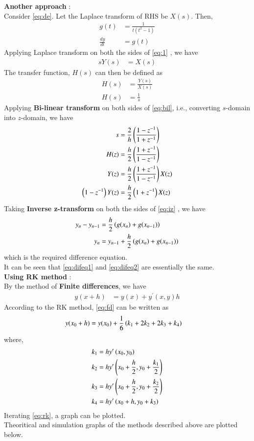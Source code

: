 \documentclass[journal]{IEEEtran}
\begin{document}
\begin{enumerate}
\textbf{Another approach} : \\
Consider \eqref{eq:de}. Let the Laplace transform of RHS be $X(s)$. Then, 
\begin{align}
	g(t) &= \frac{1}{t(t^2 - 1)} \\
	\frac{dy}{dt} &= g(t) \label{eq:1}
\end{align}
Applying Laplace transform on both the sides of \eqref{eq:1} , we have 
\begin{align}
	s Y(s) &= X(s) 
\end{align}
The transfer function, $H(s)$ can then be defined as
\begin{align}
	H(s) &= \frac{Y(s)}{X(s)} \\
	H(s) &= \frac{1}{s} \label{eq:bil}
\end{align}
Applying \textbf{Bi-linear transform} on both sides of \eqref{eq:bil}, i.e., converting $s$-domain into $z$-domain, we have
\begin{align}
	s &= \frac{2}{h} \left(\frac{1 - z^{-1}}{1 + z^{-1}}\right) \\
	H(z) &= \frac{h}{2} \left(\frac{1 + z^{-1}}{1 - z^{-1}}\right) \\
	Y(z) &= \frac{h}{2} \left(\frac{1 + z^{-1}}{1 - z^{-1}}\right) X(z) \\
	\left(1 - z^{-1}\right) Y(z) &= \frac{h}{2} \left(1 + z^{-1}\right) X(z) \label{eq:iz} 
\end{align}
Taking \textbf{Inverse z-transform} on both the sides of \eqref{eq:iz} , we have
\begin{align}
	y_{n} - y_{n-1} &= \frac{h}{2} \left(g(x_{n}) + g(x_{n-1})\right) \\
	y_{n} &= y_{n-1} + \frac{h}{2} \left(g(x_{n}) + g(x_{n-1})\right) \label{eq:difeq2}
\end{align}
which is the required difference equation. \\
It can be seen that \eqref{eq:difeq1} and \eqref{eq:difeq2} are essentially the same. \\
\textbf{Using RK method} : \\
By the method of \textbf{Finite differences}, we have \\
\begin{align}
	y(x + h) &= y(x) + y^{\prime}(x,y) h \label{eq:fd}
\end{align}
According to the RK method, \eqref{eq:fd} can be written as
\begin{align}
	y(x_0 + h) &= y(x_0) + \frac{1}{6} \left(k_1 + 2k_2 + 2k_3 + k_4\right) \label{eq:rk}
\end{align}
where, 
\begin{align}
	k_1 &= h y^{\prime} \left(x_0, y_0\right) \\
	k_2 &= h y^{\prime} \left(x_0 + \frac{h}{2}, y_0 + \frac{k_1}{2}\right) \\
	k_3 &= h y^{\prime} \left(x_0 + \frac{h}{2}, y_0 + \frac{k_2}{2}\right) \\
	k_4 &= h y^{\prime} \left(x_0 + h, y_0 + k_3\right)
\end{align}
Iterating \eqref{eq:rk}, a graph can be plotted. \\
Theoritical and simulation graphs of the methods described above are plotted below.


\end{enumerate}
\end{document}
